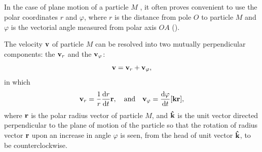 \subsection{}\label{1.3.6} In the case of plane motion of a particle $M$ , it often proves convenient to use the polar coordinates $r$ and $\varphi$, where $r$ is the distance from pole $O$ to particle $M$ and $\varphi$ is the vec­torial angle measured from polar axis $OA$ ().
\begin{marginfigure}[-2cm]
\centering

\end{marginfigure}
The velocity $\vb{v}$ of particle $M$ can be resolved into two mutually perpendicular components: the  $\vb{v}_{r}$ and the  $\vb{v}_{\varphi}$:
\begin{equation*}%
\vb{v} = \vb{v}_{r} + \vb{v}_{\varphi},
\end{equation*}
in which
\begin{equation*}%
\vb{v}_{r} = \frac{1}{r} \dv{r}{t} \vb{r}, \qand \vb{v}_{\varphi} =  \dv{\varphi}{t} [\vb{kr}],
\end{equation*}
where $\vb{r}$ is the polar radius vector of particle $M$, and $\vu{k}$ is the unit vector directed perpendicular to the plane of motion of the particle so that the rotation of radius vector $\vb{r}$ upon an increase in angle $\varphi$ is seen, from the head of unit vector $\vu{k}$, to be counterclockwise.

